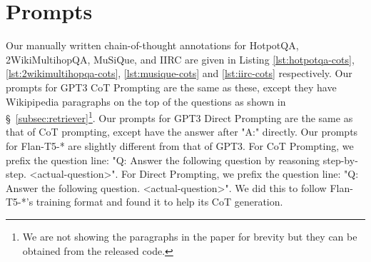 \section{Prompts}
\label{sec:apndx-prompts}
Our manually written chain-of-thought annotations for HotpotQA, 2WikiMultihopQA, MuSiQue, and IIRC are given in Listing \ref{lst:hotpotqa-cots}, \ref{lst:2wikimultihopqa-cots}, \ref{lst:musique-cots} and \ref{lst:iirc-cots} respectively. Our prompts for GPT3 CoT Prompting are the same as these, except they have Wikipipedia paragraphs on the top of the questions as shown in \S~\ref{subsec:retriever}\footnote{We are not showing the paragraphs in the paper for brevity but they can be obtained from the released code.}. Our prompts for GPT3 Direct Prompting are the same as that of CoT prompting, except have the answer after "A:" directly. Our prompts for Flan-T5-* are slightly different from that of GPT3. For CoT Prompting, we prefix the question line: "Q: Answer the following question by reasoning step-by-step. <actual-question>". For Direct Prompting, we prefix the question line: "Q: Answer the following question. <actual-question>". We did this to follow Flan-T5-*'s training format and found it to help its CoT generation.


\onecolumn
{}
\UseRawInputEncoding
{}




\twocolumn
